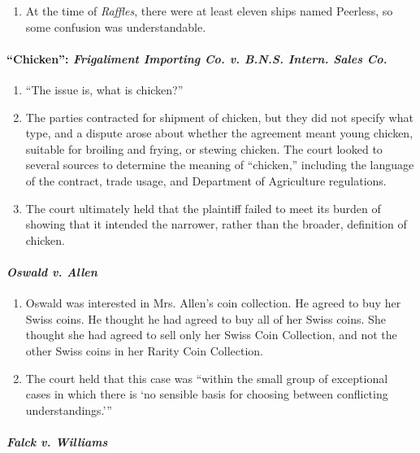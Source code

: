 \begin{enumerate}
    \item At the time of \emph{Raffles}, there were at least eleven ships 
    named Peerless, so some confusion was understandable.
\end{enumerate}

\paragraph{``Chicken'': \emph{Frigaliment Importing Co. v. B.N.S. Intern. 
Sales Co.}}

\begin{enumerate}
    \item ``The issue is, what is chicken?''
    \item The parties contracted for shipment of chicken, but they did not 
    specify what type, and a dispute arose about whether the agreement meant 
    young chicken, suitable for broiling and frying, or stewing chicken. The 
    court looked to several sources to determine the meaning of ``chicken,'' 
    including the language of the contract, trade usage, and Department of 
    Agriculture regulations.
    \item The court ultimately held that the plaintiff failed to meet its 
    burden of showing that it intended the narrower, rather than the broader, 
    definition of chicken.
\end{enumerate}

\paragraph{\emph{Oswald v. Allen}}

\begin{enumerate}
    \item Oswald was interested in Mrs. Allen's coin collection. He agreed to 
    buy her Swiss coins. He thought he had agreed to buy all of her Swiss 
    coins. She thought she had agreed to sell only her Swiss Coin Collection, 
    and not the other Swiss coins in her Rarity Coin Collection.
    \item The court held that this case was \enquote{within the small group of 
    exceptional cases in which there is \enquote{no sensible basis for 
    choosing between conflicting understandings.}}
\end{enumerate}

\paragraph{\emph{Falck v. Williams}}

